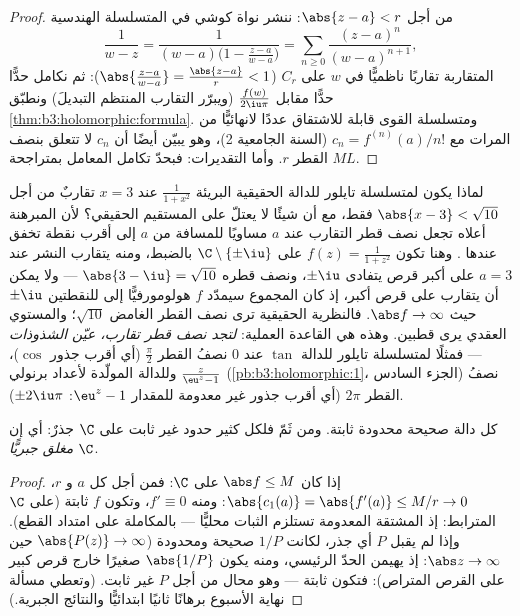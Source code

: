 \begin{proof}
من أجل $\abs{z - a} < r$: ننشر نواة كوشي في المتسلسلة الهندسية
\[
\frac1{w - z} = \frac1{(w - a)\bigl(1 - \frac{z - a}{w -
a}\bigr)} = \sum_{n\geq0}\frac{(z - a)^n}{(w - a)^{n+1}},
\]
المتقاربة تقاربًا ناظميًّا في $w$ على $C_r$ ($\abs{\frac{z-a}{w-a}} =
\frac{\abs{z-a}}r < 1$): ثم نكامل
حدًّا حدًّا مقابل $\frac{f(w)}{2\iu\pi}$ (ويبرّر التقارب المنتظم التبديلَ)
ونطبّق \cref{thm:b3:holomorphic:formula}. ومتسلسلة القوى قابلة للاشتقاق عددًا
لانهائيًّا من المرات مع $c_n =
f^{(n)}(a)/n!$ (السنة الجامعية 2)، وهو يبيّن
أيضًا أن $c_n$ لا تتعلق بنصف القطر $r$. وأما التقديرات: فبحدّ تكامل
المعامل بمتراجحة $ML$.
\end{proof}

\begin{example}
\label{ex:b3:holomorphic:radius}
لماذا يكون لمتسلسلة تايلور للدالة الحقيقية البريئة $\frac1{1 + x^2}$ عند
$x = 3$ تقاربٌ من أجل $\abs{x - 3} <
\sqrt{10}$ فقط، مع أن شيئًا لا يعتلّ على
المستقيم الحقيقي؟ لأن المبرهنة أعلاه تجعل نصف قطر التقارب عند
$a$ مساويًا للمسافة من $a$ إلى أقرب نقطة تخفق عندها
. وهنا تكون $f(z) = \frac1{1 + z^2}$  على $\C\setminus\{\pm\iu\}$ بالضبط،
ومنه يتقارب النشر عند $a = 3$ على أكبر قرص يتفادى $\pm\iu$،
ونصف قطره $\abs{3 - \iu} = \sqrt{10}$ --- ولا يمكن أن يتقارب على قرص أكبر، إذ كان
المجموع سيمدّد $f$ هولومورفيًّا إلى  للنقطتين $\pm\iu$ حيث
$\abs f \to \infty$. فالنظرية الحقيقية ترى نصف القطر الغامض $\sqrt{10}$؛
والمستوي العقدي يرى قطبين. وهذه هي القاعدة العملية:
\emph{لتجد نصف قطر تقارب، عيّن الشذوذات} --- فمثلًا لمتسلسلة
تايلور للدالة $\tan$ عند $0$ نصفُ القطر $\frac\pi2$ (أي أقرب
جذور $\cos$)، وللدالة المولّدة لأعداد برنولي $\frac z{\eu^z - 1}$
(\cref{pb:b3:holomorphic:1}، الجزء السادس) نصفُ القطر $2\pi$ (أي أقرب جذور غير
معدومة للمقدار $\eu^z - 1$: $\pm2\iu\pi$).
\end{example}

\begin{corollary}
\label{cor:b3:holomorphic:liouville}
كل دالة صحيحة محدودة ثابتة. ومن ثَمّ فلكل كثير حدود غير ثابت
على $\C$ جذرٌ: أي إن \emph{$\C$ مغلق
جبريًّا}.
\end{corollary}

\begin{proof}
إذا كان $\abs f \leq M$ على $\C$: فمن أجل كل $a$ و $r$، $\abs{c_1(a)}
= \abs{f'(a)} \leq M/r \to 0$:
ومنه $f' \equiv 0$، وتكون $f$ ثابتة (على $\C$ المترابط: إذ
المشتقة المعدومة تستلزم الثبات محليًّا --- بالمكاملة على
امتداد القطع). وإذا لم يقبل $P$ أي جذر، لكانت $1/P$ صحيحة
ومحدودة ($\abs{P(z)} \to
\infty$ حين $\abs z \to \infty$: إذ يهيمن الحدّ الرئيسي، ومنه
يكون $\abs{1/P}$ صغيرًا خارج قرص كبير  على القرص
المتراص): فتكون ثابتة --- وهو محال من أجل $P$ غير ثابت. (وتعطي
مسألة نهاية الأسبوع برهانًا ثانيًا ابتدائيًّا والنتائج
الجبرية.)
\end{proof}

